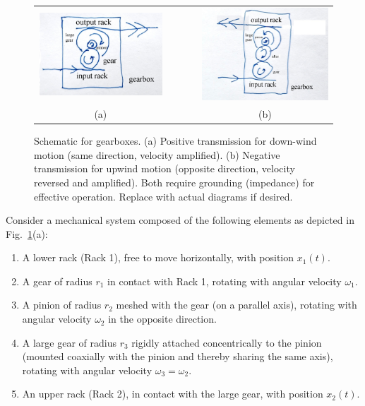 \documentclass[reprint,aps,pra,superscriptaddress,longbibliography]{revtex4-2}
\begin{document}
\begin{figure}[htbp]
    \centering
        \begin{tabular}{ccc}
\includegraphics[width=0.8\columnwidth]{2025-windgww.jpg}
&$\qquad$&
\includegraphics[width=0.8\columnwidth]{2025-windgaw.jpg}
\\
(a)&&(b)
\end{tabular}
    \caption{Schematic for gearboxes. (a) Positive transmission for down-wind motion (same direction, velocity amplified). (b) Negative transmission for upwind motion (opposite direction, velocity reversed and amplified). Both require grounding (impedance) for effective operation. Replace with actual diagrams if desired.}
    \label{fig:gearboxes}
\end{figure}

Consider a mechanical system composed of the following elements as depicted in Fig.~\ref{fig:gearboxes}(a):

\begin{enumerate}
    \item A lower rack (Rack 1), free to move horizontally, with position $x_1(t)$.
    \item A gear of radius $r_1$ in contact with Rack 1, rotating with angular velocity $\omega_1$.
    \item A pinion of radius $r_2$ meshed with the gear (on a parallel axis), rotating with angular velocity $\omega_2$ in the opposite direction.
    \item A large gear of radius $r_3$ rigidly attached concentrically to the pinion (mounted coaxially with the pinion and thereby sharing the same axis), rotating with angular velocity $\omega_3 = \omega_2$.
    \item An upper rack (Rack 2), in contact with the large gear, with position $x_2(t)$.
\end{enumerate}
\end{document}
